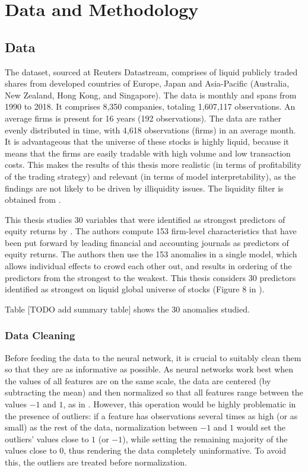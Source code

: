 \chapter{Data and Methodology}
\label{chap:met}

\section{Data}

	The dataset, sourced at Reuters Datastream, comprises of liquid publicly traded shares from developed countries of Europe, Japan and Asia-Pacific (Australia, New Zealand, Hong Kong, and Singapore). The data is monthly and spans from 1990 to 2018. It comprises 8,350 companies, totaling 1,607,117 observations. An average firms is present for 16 years (192 observations). The data are rather evenly distributed in time, with 4,618 observations (firms) in an average month. It is advantageous that the universe of these stocks is highly liquid, because it means that the firms are easily tradable with high volume and low transaction costs. This makes the results of this thesis more realistic (in terms of profitability of the trading strategy) and relevant (in terms of model interpretability), as the findings are not likely to be driven by illiquidity issues. The liquidity filter is obtained from \cite{tobek2020does}.  
	
	This thesis studies 30 variables that were identified as strongest predictors of equity returns by \cite{tobek2020does}. The authors compute 153  firm-level characteristics that have been put forward by leading financial and accounting journals as predictors of equity returns. The authors then use the 153 anomalies in a single model, which allows individual effects to crowd each other out, and results in ordering of the predictors from the strongest to the weakest. This thesis considers 30 predictors identified as strongest on liquid global universe of stocks (Figure 8 in \cite{tobek2020does}).
	
	Table [TODO add summary table] shows the 30 anomalies studied. 
	
	\subsection{Data Cleaning}
	
		Before feeding the data to the neural network, it is crucial to suitably clean them so that they are as informative as possible. As neural networks work best when the values of all features are on the same scale, the data are centered (by subtracting the mean) and then normalized so that all features range between the values $-1$ and $1$, as in \cite{gu2020empirical}. However, this operation would be highly problematic in the presence of outliers: if a feature has observations several times as high (or as small) as the rest of the data, normalization between $-1$ and $1$ would set the outliers' values close to $1$ (or $-1$), while setting the remaining majority of the values close to 0, thus rendering the data completely uninformative. To avoid this, the outliers are treated before normalization.
		
